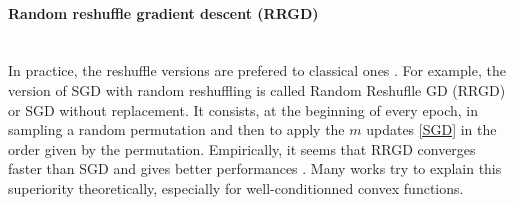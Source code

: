 \paragraph{Random reshuffle gradient descent (RRGD)}
~~\\
In practice, the reshuffle versions are prefered to classical ones \cite{RR_use1,RR_use2,RG_mean}. For example, the version of SGD with random reshuffling is called Random Reshuflle GD (RRGD) or SGD without replacement. It consists, at the beginning of every epoch, in sampling a random permutation and then to apply the $m$ updates \eqref{SGD} in the order given by the permutation. Empirically, it seems that RRGD converges faster than SGD and gives better performances \cite{RR_use1,RR_use_superior}. Many works \cite{RR_outperforms_quadratics,RR_use3,RR_outperforms_convex,RR_small_epochs} try to explain this superiority theoretically, especially for well-conditionned convex functions.

